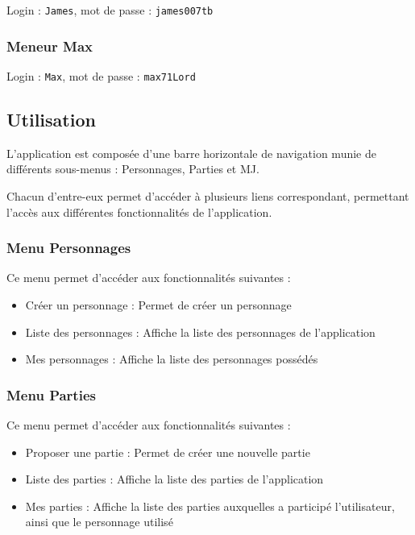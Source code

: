 \documentclass[a4paper, 11pt, titlepage]{article}
\begin{document}
Login : \lstinline!James!, mot de passe : \lstinline!james007tb!


\subsubsection {Meneur Max}

Login : \lstinline!Max!, mot de passe : \lstinline!max71Lord!




\subsection {Utilisation}

L'application est composée d'une barre horizontale de navigation munie de différents sous-menus : Personnages, Parties et MJ.

Chacun d'entre-eux permet d'accéder à plusieurs liens correspondant, permettant l'accès aux différentes fonctionnalités de l'application.


\subsubsection {Menu Personnages}

Ce menu permet d'accéder aux fonctionnalités suivantes :

\begin{itemize}
\item
Créer un personnage : Permet de créer un personnage

\item
Liste des personnages : Affiche la liste des personnages de l'application

\item
Mes personnages : Affiche la liste des personnages possédés

\end{itemize}


\subsubsection {Menu Parties}

Ce menu permet d'accéder aux fonctionnalités suivantes :

\begin{itemize}
\item
Proposer une partie : Permet de créer une nouvelle partie

\item
Liste des parties : Affiche la liste des parties de l'application

\item
Mes parties : Affiche la liste des parties auxquelles a participé l'utilisateur, ainsi que le personnage utilisé

\end{itemize}
\end{document}
